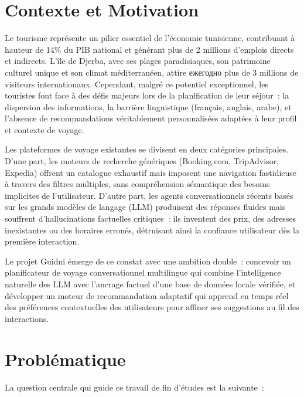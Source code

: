 
\section{Contexte et Motivation}

Le tourisme représente un pilier essentiel de l'économie tunisienne, contribuant à hauteur de 
14\% du PIB national et générant plus de 2 millions d'emplois directs et indirects. L'île de 
Djerba, avec ses plages paradisiaques, son patrimoine culturel unique et son climat méditerranéen, 
attire ежегодно plus de 3 millions de visiteurs internationaux. Cependant, malgré ce potentiel 
exceptionnel, les touristes font face à des défis majeurs lors de la planification de leur séjour~: 
la dispersion des informations, la barrière linguistique (français, anglais, arabe), et l'absence 
de recommandations véritablement personnalisées adaptées à leur profil et contexte de voyage.

Les plateformes de voyage existantes se divisent en deux catégories principales. D'une part, les 
moteurs de recherche génériques (Booking.com, TripAdvisor, Expedia) offrent un catalogue exhaustif 
mais imposent une navigation fastidieuse à travers des filtres multiples, sans compréhension 
sémantique des besoins implicites de l'utilisateur. D'autre part, les agents conversationnels 
récents basés sur les grands modèles de langage (LLM) produisent des réponses fluides mais 
souffrent d'hallucinations factuelles critiques~: ils inventent des prix, des adresses inexistantes 
ou des horaires erronés, détruisant ainsi la confiance utilisateur dès la première interaction.

Le projet Guidni émerge de ce constat avec une ambition double~: concevoir un planificateur de 
voyage conversationnel multilingue qui combine l'intelligence naturelle des LLM avec l'ancrage 
factuel d'une base de données locale vérifiée, et développer un moteur de recommandation adaptatif 
qui apprend en temps réel des préférences contextuelles des utilisateurs pour affiner ses 
suggestions au fil des interactions.

\section{Problématique}

La question centrale qui guide ce travail de fin d'études est la suivante~:

